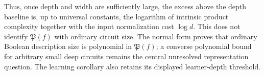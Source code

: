 Thus, once depth and width are sufficiently large, the excess above
the depth baseline is, up to universal constants, the logarithm of
intrinsic product complexity together with the input normalization
cost $\log d$. This does not identify $\mathfrak P(f)$ with ordinary
circuit size. The normal form proves that ordinary Boolean description
size is polynomial in $\mathfrak P(f)$; a converse polynomial bound
for arbitrary small deep circuits remains the central unresolved
representation question. The learning corollary also retains its
displayed learner-depth threshold.

